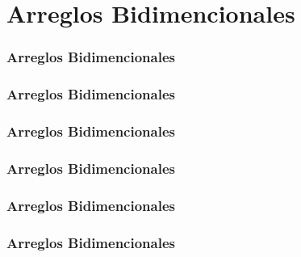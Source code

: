 \section*{Arreglos Bidimencionales}

\begin{frame}
\frametitle{Arreglos Bidimencionales}
\end{frame}


\begin{frame}
\frametitle{Arreglos Bidimencionales}
\end{frame}

\begin{frame}
\frametitle{Arreglos Bidimencionales}
\end{frame}

\begin{frame}
\frametitle{Arreglos Bidimencionales}
\end{frame}

\begin{frame}
\frametitle{Arreglos Bidimencionales}
\end{frame}

\begin{frame}
\frametitle{Arreglos Bidimencionales}
\end{frame}